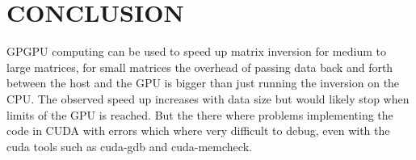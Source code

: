 
\section{CONCLUSION}
\label{sec:conclusion}

GPGPU computing can be used to speed up matrix inversion for medium to large matrices, for small matrices the overhead of passing data back and forth between the host and the GPU is bigger than just running the inversion on the CPU. The observed speed up increases with data size but would likely stop when limits of the GPU is reached. But the there where problems implementing the code in CUDA with errors which where very difficult to debug, even with the cuda tools such as cuda-gdb and cuda-memcheck.